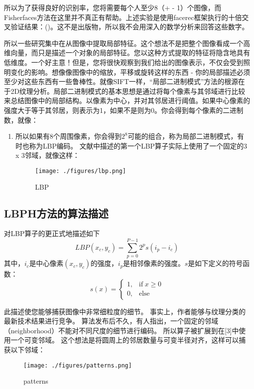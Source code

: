 \documentclass[UTF8]{ctexart}
\begin{document}
所以为了获得良好的识别率，您将需要每个人至少8（+ - 1）个图像，而Fisherfaces方法在这里并不真正有帮助。上述实验是使用facerec框架执行的十倍交叉验证结果：({\color{blue}{https：//github.com/bytefish/facerec}})。这不是出版物，所以我不会用深入的数学分析来回答这些数字。

所以一些研究集中在从图像中提取局部特征。这个想法不是把整个图像看成一个高维向量，而只是描述一个对象的局部特征。您以这种方式提取的特征将隐含地具有低维度。一个好主意！但是，您将很快观察到我们给出的图像表示，不仅会受到照明变化的影响。想像像图像中的缩放，平移或旋转这样的东西 - 你的局部描述必须至少对这些东西有一些鲁棒性。就像SIFT一样，“局部二进制模式”方法的根源在于2D纹理分析。局部二进制模式的基本思想是通过将每个像素与其邻域进行比较来总结图像中的局部结构。以像素为中心，并对其邻居进行阈值。如果中心像素的强度大于等于其邻居，则表示为1，如果不是则为0。你会得到每个像素的二进制数，就像：
\begin{enumerate}
	\item 所以如果有8个周围像素，你会得到$2^8$可能的组合，称为局部二进制模式，有时也称为LBP编码。 文献中描述的第一个LBP算子实际上使用了一个固定的3 x 3邻域，就像这样：
\begin{figure}[htbp]
	\centerline{\texttt{[image: ./figures/lbp.png]}}
	\caption{LBP}
\end{figure}
\end{enumerate}

\subsection{LBPH方法的算法描述}
对LBP算子的更正式地描述如下
\begin{equation}
	LBP(x_c, y_c) = \sum_{p = 0}^{P-1} 2^p s(i_p - i_c)
\end{equation}
其中，$i_c$是中心像素$(x_c, y_c)$的强度，$i_p$是相邻像素的强度。$s$是如下定义的符号函数：
\begin{equation}
	s(x) = \begin{cases}
		1, & \text{if} \; x \ge 0 \\
		0, & \text{else}
	\end{cases}
\end{equation}

此描述使您能够捕获图像中非常细粒度的细节。 事实上，作者能够与纹理分类的最新技术结果进行竞争。 算法发布后不久，有人指出，一个固定的邻域（neighborhood）不能对不同尺度的细节进行编码。 所以算子被扩展到在[3]中使用一个可变邻域。 这个想法是将圆周上的邻居数量与可变半径对齐，这样可以捕获以下邻域：
\begin{figure}[htbp]
	\centerline{\texttt{[image: ./figures/patterns.png]}}
	\caption{patterns}
\end{figure}
\end{document}
